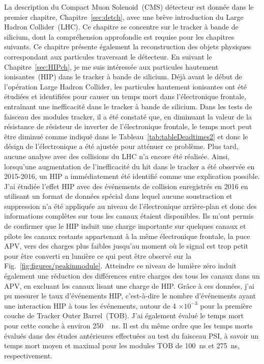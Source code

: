 La description du Compact Muon Solenoid~(CMS)  détecteur est donnée dans le premier chapitre, Chapitre~\ref{sec:detch}, avec une brève introduction du Large Hadron Collider~(LHC). Ce chapitre se concentre sur le tracker à bande de silicium, dont la compréhension approfondie est requise pour les chapitres suivants. Ce chapitre présente également la reconstruction des objets physiques correspondant aux particules traversant le détecteur. En suivant le Chapitre~\ref{sec:HIPch}, je me suis intéressée aux particules hautement ionisantes~(HIP) dans le tracker à bande de silicium. Déjà avant le début de l'opération Large Hadron Collider, les particules hautement ionisantes ont été étudiées et identifiées pour causer un temps mort dans l'électronique frontale, entraînant une inefficacité dans le tracker à bande de silicium. Dans les tests de faisceau des modules tracker, il a été constaté que, en diminuant la valeur de la résistance de résisteur de inverter de l’électronique frontale, le temps mort peut être diminué comme indiqué dans le Tableau~\ref{tab:tableDeadtimes2} et donc le désign de l'électronique a été ajustée pour atténuer ce problème. Plus tard, aucune analyse avec des collisions du LHC n'a encore été réalisée. Ainsi, lorsqu'une augmentation de l'inefficacité du hit dans le tracker a été observée en 2015-2016, un HIP a immédiatement été identifié comme une explication possible. J'ai étudiée l'effet HIP avec des événements de collision enregistrés en 2016 en utilisant un format de données spécial dans lequel aucune soustraction et suppression n'a été appliquée au niveau de l'électronique arrière-plan et donc des informations complètes sur tous les canaux étaient disponibles. Ils m'ont permis de confirmer que le HIP induit une charge importante sur quelques canaux et pilote les canaux restants appartenant à la même électronique frontale, la puce APV, vers des charges plus faibles jusqu'au moment où le signal est trop petit pour être converti en lumière ce qui peut être observé sur la Fig.~\ref{fig:figures/peakinmodule}. Atteindre ce niveau de lumière zéro induit également une réduction des différences entre charges des tous les canaux dans un APV, en excluant les canaux lisant une charge de HIP. Grâce à ces données, j'ai pu mesurer le taux d'événements HIP, c'est-à-dire le nombre d'événements ayant une interaction HIP  à  tous les événements, autour de 4 $\times 10^{-3} $ pour la première couche de Tracker Outer Barrel~(TOB). J'ai également évalué le temps mort pour cette couche à environ 250 ~ ns. Il est du même ordre que les temps morts évalués dans des études antérieures effectuées au test du faisceau PSI, à savoir un temps mort moyen et maximal pour les modules TOB de 100~ns et 275~ns, respectivement.

